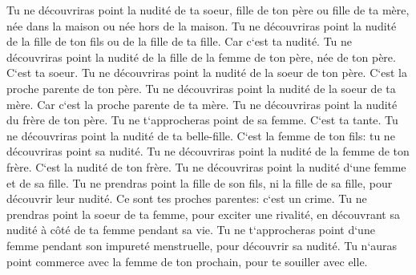 \verse Tu ne découvriras point la nudité de ta soeur, fille de ton père ou fille de ta mère, née dans la maison ou née hors de la maison. 
\verse Tu ne découvriras point la nudité de la fille de ton fils ou de la fille de ta fille. Car c`est ta nudité. 
\verse Tu ne découvriras point la nudité de la fille de la femme de ton père, née de ton père. C`est ta soeur. 
\verse Tu ne découvriras point la nudité de la soeur de ton père. C`est la proche parente de ton père. 
\verse Tu ne découvriras point la nudité de la soeur de ta mère. Car c`est la proche parente de ta mère. 
\verse Tu ne découvriras point la nudité du frère de ton père. Tu ne t`approcheras point de sa femme. C`est ta tante. 
\verse Tu ne découvriras point la nudité de ta belle-fille. C`est la femme de ton fils: tu ne découvriras point sa nudité. 
\verse Tu ne découvriras point la nudité de la femme de ton frère. C`est la nudité de ton frère. 
\verse Tu ne découvriras point la nudité d`une femme et de sa fille. Tu ne prendras point la fille de son fils, ni la fille de sa fille, pour découvrir leur nudité. Ce sont tes proches parentes: c`est un crime. 
\verse Tu ne prendras point la soeur de ta femme, pour exciter une rivalité, en découvrant sa nudité à côté de ta femme pendant sa vie. 
\verse Tu ne t`approcheras point d`une femme pendant son impureté menstruelle, pour découvrir sa nudité. 
\verse Tu n`auras point commerce avec la femme de ton prochain, pour te souiller avec elle. 
